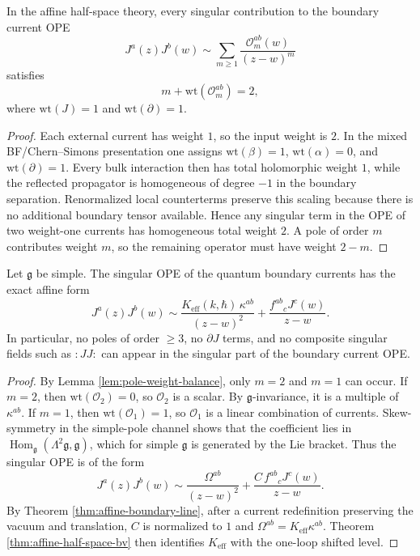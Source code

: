 \begin{lemma}\label{lem:pole-weight-balance}
In the affine half-space theory, every singular contribution to the boundary current OPE
\[
J^a(z)J^b(w)\sim \sum_{m\ge 1} \frac{{\mathcal O}^{ab}_m(w)}{(z-w)^m}
\]
satisfies
\begin{equation}
\label{eq:pole-weight-balance}
m + \mathrm{wt}({\mathcal O}^{ab}_m)=2,
\end{equation}
where $\mathrm{wt}(J)=1$ and $\mathrm{wt}(\partial)=1$.
\end{lemma}

\begin{proof}
Each external current has weight $1$, so the input weight is $2$.
In the mixed BF/Chern--Simons presentation one assigns
$\mathrm{wt}(\beta)=1$, $\mathrm{wt}(\alpha)=0$, and $\mathrm{wt}(\partial)=1$.
Every bulk interaction then has total holomorphic weight $1$, while the reflected propagator is homogeneous
of degree $-1$ in the boundary separation. Renormalized local counterterms preserve this scaling because there is
no additional boundary tensor available. Hence any singular term in the OPE of two weight-one currents has
homogeneous total weight $2$. A pole of order $m$ contributes weight $m$, so the remaining operator must have
weight $2-m$.
\end{proof}

\begin{theorem}\label{thm:current-sector-rigidity}
Let $\mathfrak g$ be simple. The singular OPE of the quantum boundary currents has the exact affine form
\begin{equation}
\label{eq:quantum-affine-boundary-ope}
J^a(z)J^b(w)
\sim
\frac{K_{\mathrm{eff}}(k,\hbar)\,\kappa^{ab}}{(z-w)^2}
+
\frac{f^{ab}{}_c J^c(w)}{z-w}.
\end{equation}
In particular, no poles of order $\ge 3$, no $\partial J$ terms, and no composite singular fields such as
$\! :JJ: \!$ can appear in the singular part of the boundary current OPE.
\end{theorem}

\begin{proof}
By Lemma \ref{lem:pole-weight-balance}, only $m=2$ and $m=1$ can occur.
If $m=2$, then $\mathrm{wt}({\mathcal O}_2)=0$, so ${\mathcal O}_2$ is a scalar. By $\mathfrak g$-invariance,
it is a multiple of $\kappa^{ab}$.
If $m=1$, then $\mathrm{wt}({\mathcal O}_1)=1$, so ${\mathcal O}_1$ is a linear combination of currents.
Skew-symmetry in the simple-pole channel shows that the coefficient lies in
$\operatorname{Hom}_{\mathfrak g}(\Lambda^2\mathfrak g,\mathfrak g)$, which for simple $\mathfrak g$ is generated by the Lie bracket.
Thus the singular OPE is of the form
\[
J^a(z)J^b(w)
\sim
\frac{\Omega^{ab}}{(z-w)^2} + \frac{C\,f^{ab}{}_cJ^c(w)}{z-w}.
\]
By Theorem \ref{thm:affine-boundary-line}, after a current redefinition preserving the vacuum and translation,
$C$ is normalized to $1$ and $\Omega^{ab}=K_{\mathrm{eff}}\kappa^{ab}$.
Theorem \ref{thm:affine-half-space-bv} then identifies $K_{\mathrm{eff}}$ with the one-loop shifted level.
\end{proof}

